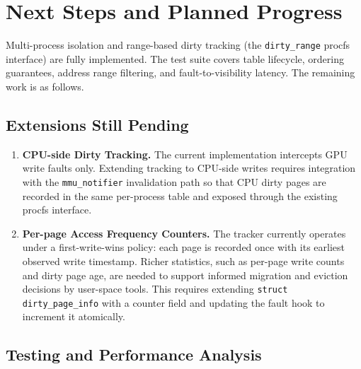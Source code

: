 \section*{Next Steps and Planned Progress}

Multi-process isolation and range-based dirty tracking (the \texttt{dirty\_range} procfs interface) are fully implemented.
The test suite covers table lifecycle, ordering guarantees, address range filtering, and
fault-to-visibility latency. The remaining work is as follows.

\subsection*{Extensions Still Pending}

\begin{enumerate}
    \item \textbf{CPU-side Dirty Tracking.}
          The current implementation intercepts GPU write faults only. Extending tracking to
          CPU-side writes requires integration with the \texttt{mmu\_notifier} invalidation
          path so that CPU dirty pages are recorded in the same per-process table and exposed
          through the existing procfs interface.

    \item \textbf{Per-page Access Frequency Counters.}
          The tracker currently operates under a first-write-wins policy: each page is recorded
          once with its earliest observed write timestamp. Richer statistics, such as per-page
          write counts and dirty page age, are needed to support informed migration and eviction
          decisions by user-space tools. This requires extending \texttt{struct dirty\_page\_info}
          with a counter field and updating the fault hook to increment it atomically.
\end{enumerate}

\subsection*{Testing and Performance Analysis}


